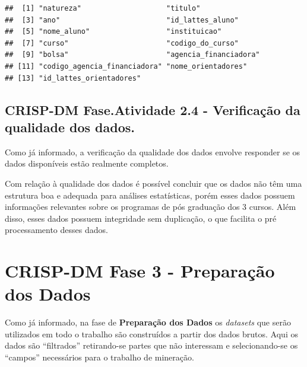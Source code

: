 \documentclass[]{article}
\newenvironment{Shaded}{\begin{snugshade}}{\end{snugshade}}
\newcommand{\KeywordTok}[1]{\textcolor[rgb]{0.13,0.29,0.53}{\textbf{#1}}}
\newcommand{\DataTypeTok}[1]{\textcolor[rgb]{0.13,0.29,0.53}{#1}}
\newcommand{\StringTok}[1]{\textcolor[rgb]{0.31,0.60,0.02}{#1}}
\newcommand{\OperatorTok}[1]{\textcolor[rgb]{0.81,0.36,0.00}{\textbf{#1}}}
\newcommand{\NormalTok}[1]{#1}
\begin{document}
\begin{Shaded}
\end{Shaded}

\begin{verbatim}
##  [1] "natureza"                    "titulo"                     
##  [3] "ano"                         "id_lattes_aluno"            
##  [5] "nome_aluno"                  "instituicao"                
##  [7] "curso"                       "codigo_do_curso"            
##  [9] "bolsa"                       "agencia_financiadora"       
## [11] "codigo_agencia_financiadora" "nome_orientadores"          
## [13] "id_lattes_orientadores"
\end{verbatim}

\subsection{CRISP-DM Fase.Atividade 2.4 - Verificação da qualidade dos
dados.}\label{crisp-dm-fase.atividade-2.4---verificacao-da-qualidade-dos-dados.}

Como já informado, a verificação da qualidade dos dados envolve
responder se os dados disponíveis estão realmente completos.

Com relação à qualidade dos dados é possível concluir que os dados não
têm uma estrutura boa e adequada para análises estatísticas, porém esses
dados possuem informações relevantes sobre os programas de pós graduação
dos 3 cursos. Além disso, esses dados possuem integridade sem
duplicação, o que facilita o pré processamento desses dados.

\section{\texorpdfstring{CRISP-DM Fase 3 - \textbf{Preparação dos
Dados}}{CRISP-DM Fase 3 - Preparação dos Dados}}\label{crisp-dm-fase-3---preparacao-dos-dados}

Como já informado, na fase de \textbf{Preparação dos Dados} os
\emph{datasets} que serão utilizados em todo o trabalho são construídos
a partir dos dados brutos. Aqui os dados são ``filtrados'' retirando-se
partes que não interessam e selecionando-se os ``campos'' necessários
para o trabalho de mineração.
\end{document}
